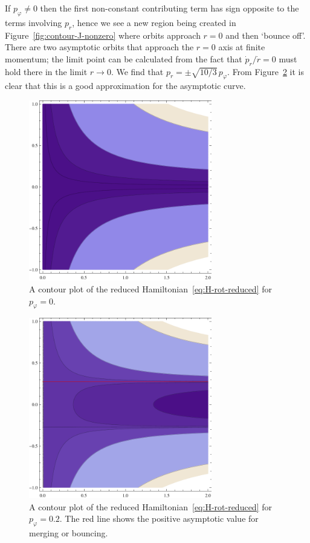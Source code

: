 \documentclass[12pt]{amsart}
\begin{document}
If $p_\varphi \neq 0$ then the first non-constant contributing term has
sign opposite to the terms involving $p_r$, hence we see a new region
being created in Figure~\eqref{fig:contour-J-nonzero} where orbits
approach $r = 0$ and then `bounce off'. There are two asymptotic
orbits that approach the $r = 0$ axis at finite momentum; the limit
point can be calculated from the fact that $\dot{p}_r / \dot{r} = 0$
must hold there in the limit $r \to 0$. We find that
$p_r = \pm \sqrt{10/3}\,p_\varphi$. From
Figure~\ref{fig:contour-J-nonzero} it is clear that this is a good
approximation for the asymptotic curve.

\begin{figure}[ht]
  \centering
  \includegraphics[width=8cm]{Ham-contour-Jzero}
  \caption{A contour plot of the reduced
    Hamiltonian~\eqref{eq:H-rot-reduced} for $p_\varphi = 0$.}
  \label{fig:contour-J-zero}
\end{figure}
\begin{figure}[ht]
  \centering
  \includegraphics[width=8cm]{Ham-contour-Jnonzero}
  \caption{A contour plot of the reduced
    Hamiltonian~\eqref{eq:H-rot-reduced} for $p_\varphi = 0.2$. The red
    line shows the positive asymptotic value for merging or bouncing.}
  \label{fig:contour-J-nonzero}
\end{figure}
\end{document}
